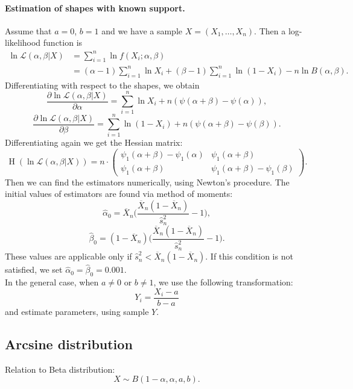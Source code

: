 \documentclass[a4paper,11pt]{article}
\theoremstyle{plain}
\theoremstyle{definition}
\begin{document}
	\paragraph{Estimation of shapes with known support.} Assume that $a=0$, $b=1$ and we have a sample $X = (X_1, \dots, X_n)$. Then a log-likelihood function is
	\begin{equation} \label{Beta log-likelihood}
	\begin{aligned}
	\ln \mathcal{L} (\alpha, \beta | X) &= \sum_{i=1}^{n} \ln f(X_i; \alpha, \beta) \\
	& = (\alpha - 1) \sum_{i=1}^{n} \ln X_i + (\beta - 1) \sum_{i=1}^{n}\ln (1-X_i) - n \ln B(\alpha, \beta).
	\end{aligned}  
	\end{equation}
	Differentiating with respect to the shapes, we obtain
	\[
	\frac{\partial \ln \mathcal{L}(\alpha, \beta | X)}{\partial \alpha} = \sum_{i=1}^{n} \ln X_i + n(\psi(\alpha + \beta) - \psi(\alpha)),
	 \]
	\[
	\frac{\partial \ln \mathcal{L}(\alpha, \beta | X)}{\partial \beta} = \sum_{i=1}^{n} \ln (1-X_i) + n(\psi(\alpha + \beta) - \psi(\beta)).
	\]
	Differentiating again we get the Hessian matrix:
	\[
	\operatorname{H}(\ln\mathcal{L}(\alpha,\beta|X)) = n \cdot \begin{pmatrix}
	\psi_1(\alpha+\beta)-\psi_1(\alpha) & \psi_1(\alpha+\beta) \\
	\psi_1(\alpha+\beta) & \psi_1(\alpha+\beta)-\psi_1(\beta)
	\end{pmatrix}.
	\]
	Then we can find the estimators numerically, using Newton's procedure. The initial values of estimators are found via method of moments:
	\[
	\hat{\alpha}_0 = \overline{X}_n \Bigg( \frac{\overline{X}_n(1-\overline{X}_n)}{\hat{s}_n^2} - 1 \Bigg),
	\]
	\[
	\hat{\beta}_0 = (1-\overline{X}_n) \Bigg( \frac{\overline{X}_n(1-\overline{X}_n)}{\hat{s}_n^2} - 1 \Bigg).
	\]
	These values are applicable only if $\hat{s}_n^2 < \overline{X}_n(1-\overline{X}_n)$. If this condition is not satisfied, we set $\hat{\alpha}_0 = \hat{\beta}_0 = 0.001$.\\
	In the general case, when $a \neq 0$ or $b \neq 1$, we use the following transformation:
	\[ Y_i = \frac{X_i - a}{b - a} \]
	and estimate parameters, using sample $Y$.
	
	\subsection{Arcsine distribution}
	Relation to Beta distribution: \[ X \sim B(1-\alpha, \alpha, a, b). \]
\end{document}
